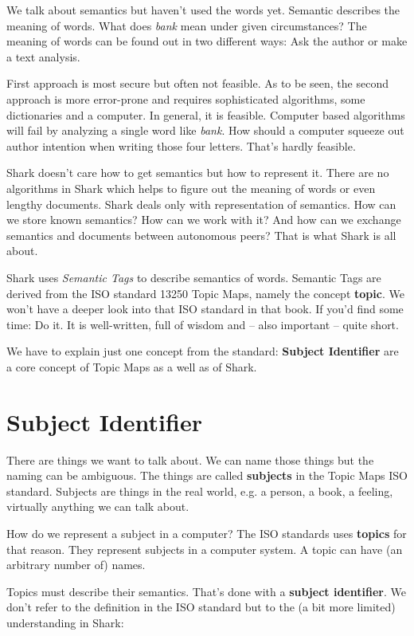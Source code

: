 We talk about semantics but haven't used the words yet. Semantic describes the meaning of words. What does {\it bank} mean under given circumstances? The meaning of words can be found out in two different ways: Ask the author or make a text analysis. 

First approach is most secure but often not feasible. As to be seen, the second approach is more error-prone and requires sophisticated algorithms, some dictionaries and a computer. In general, it is feasible. Computer based algorithms will fail by analyzing a single word like {\it bank}. How should a computer squeeze out author intention when writing those four letters. That's hardly feasible.

Shark doesn't care how to get semantics but how to represent it. There are no algorithms in Shark which helps to figure out the meaning of words or even lengthy documents. Shark deals only with representation of semantics. How can we store known semantics? How can we work with it? And how can we exchange semantics and documents between autonomous peers? That is what Shark is all about.

Shark uses {\it Semantic Tags} to describe semantics of words. Semantic Tags are derived from the ISO standard 13250 Topic Maps, namely the concept {\bf topic}. We won't have a deeper look into that ISO standard in that book. If you'd find some time: Do it. It is well-written, full of wisdom and -- also important -- quite short.

We have to explain just one concept from the standard: {\bf Subject Identifier} are a core concept of Topic Maps as a well as of Shark.

\section{Subject Identifier}
There are things we want to talk about. We can name those things but the naming can be ambiguous. The things are called {\bf subjects} in the Topic Maps ISO standard. Subjects are things in the real world, e.g. a person, a book, a feeling, virtually anything we can talk about.

How do we represent a subject in a computer? The ISO standards uses {\bf topics} for that reason. They represent subjects in a computer system. A topic can have (an arbitrary number of) names. 

Topics must describe their semantics. That's done with a {\bf subject identifier}. We don't refer to the definition in the ISO standard but to the (a bit more limited) understanding in Shark:

